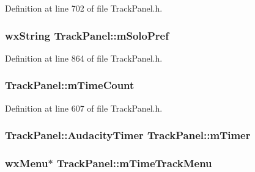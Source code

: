 Definition at line 702 of file Track\+Panel.\+h.

\subsubsection[{\texorpdfstring{m\+Solo\+Pref}{mSoloPref}}]{\setlength{\rightskip}{0pt plus 5cm}wx\+String Track\+Panel\+::m\+Solo\+Pref\hspace{0.3cm}{\ttfamily [protected]}}\hypertarget{class_track_panel_ad89b7920398dbf82965379e2d0ba0013}{}\label{class_track_panel_ad89b7920398dbf82965379e2d0ba0013}


Definition at line 864 of file Track\+Panel.\+h.

\subsubsection[{\texorpdfstring{m\+Time\+Count}{mTimeCount}}]{ Track\+Panel\+::m\+Time\+Count\hspace{0.3cm}{\ttfamily [protected]}}\hypertarget{class_track_panel_ac49fa36d784ff704edbf92cafca23b7c}{}\label{class_track_panel_ac49fa36d784ff704edbf92cafca23b7c}


Definition at line 607 of file Track\+Panel.\+h.

\subsubsection[{\texorpdfstring{m\+Timer}{mTimer}}]{\setlength{\rightskip}{0pt plus 5cm} {\bf Track\+Panel\+::\+Audacity\+Timer}  Track\+Panel\+::m\+Timer\hspace{0.3cm}{\ttfamily [protected]}}\hypertarget{class_track_panel_ab8dd1b9f070a6331441767ae27564ad5}{}\label{class_track_panel_ab8dd1b9f070a6331441767ae27564ad5}
\subsubsection[{\texorpdfstring{m\+Time\+Track\+Menu}{mTimeTrackMenu}}]{\setlength{\rightskip}{0pt plus 5cm}wx\+Menu$\ast$ Track\+Panel\+::m\+Time\+Track\+Menu\hspace{0.3cm}{\ttfamily [protected]}}\hypertarget{class_track_panel_afd5aba64f5cdfc8b0a58dbe52bd171af}{}\label{class_track_panel_afd5aba64f5cdfc8b0a58dbe52bd171af}


